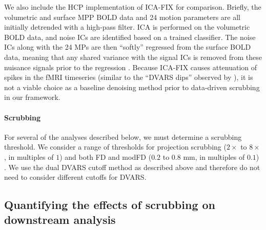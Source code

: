 \documentclass{article}
\begin{document}
We also include the HCP implementation of ICA-FIX for comparison. %
Briefly, the volumetric and surface MPP BOLD data and 24 motion parameters are all initially detrended with a high-pass filter. ICA is performed on the volumetric BOLD data, and noise ICs are identified based on a trained classifier. The noise ICs along with the 24 MPs are then ``softly'' regressed from the surface BOLD data, meaning that any shared variance with the signal ICs is removed from these nuisance signals prior to the regression \citep{griffantiICAbasedArtefactRemoval2014}. Because ICA-FIX causes attenuation of spikes in the fMRI timeseries (similar to the ``DVARS dips'' observed by \citep{glasser2018using}), it is not a viable choice as a baseline denoising method prior to data-driven scrubbing in our framework. 

\paragraph{Scrubbing} For several of the analyses described below, we must determine a scrubbing threshold. We consider a range of thresholds for projection scrubbing ($2\times$ to $8\times$, in multiples of $1$) and both FD and modFD ($0.2$ to $0.8$ mm, in multiples of $0.1$) .%
We use the dual DVARS cutoff method as described above and therefore do not need to consider different cutoffs for DVARS. 

\subsection{Quantifying the effects of scrubbing on downstream analysis}
\end{document}
